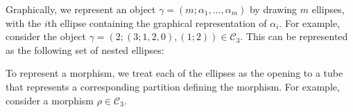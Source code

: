 \documentclass[12pt, a4paper]{amsart}
\def\CC{\mathcal{C}}
\theoremstyle{definition}
\theoremstyle{remark}
\numberwithin{equation}{section}
\begin{document}
Graphically, we represent an object $\gamma = (m;\alpha_1,\dots,\alpha_m)$ by drawing $m$ ellipses, with the $i$th ellipse containing the graphical representation of $\alpha_i$. For example, consider the object $\gamma = (2;(3;1,2,0),(1;2)) \in \CC_3$. This can be represented as the following set of nested ellipses:

\begin{center}
\end{center}
To represent a morphism, we treat each of the ellipses as the opening to a tube that represents a corresponding partition defining the morphism. For example, consider a morphism $\rho \in \CC_3$. 
%  
%  
%  
\end{document}
